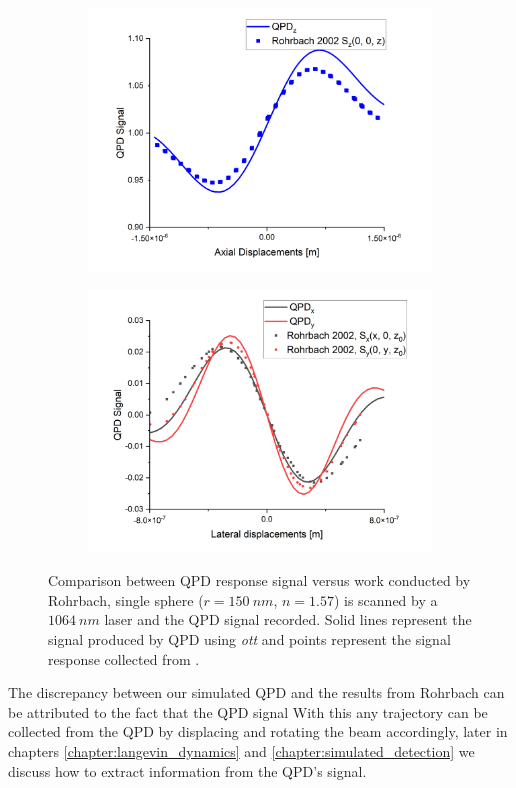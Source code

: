 \begin{figure}[h!]
	\begin{subfigure}{0.475 \linewidth}
		\subcaption{}
		\includegraphics[width=\linewidth]{QPD_axial_tests.png}
	\end{subfigure}
	\begin{subfigure}{0.475 \linewidth}
		\subcaption{}
		\includegraphics[width=\linewidth]{QPD_lat_tests.png}
	\end{subfigure}
	\caption{Comparison between QPD response signal versus work conducted by 
		Rohrbach, single sphere ($r = 150\ nm$, $n=1.57$) is scanned by a $1064\ nm$ laser and the QPD signal recorded. Solid lines represent the signal 
		produced by QPD using \textit{ott} and points represent the signal 
		response collected from \cite{Rohrbach2002}.}
	\label{fig:Rohrbach}
\end{figure}

The discrepancy between our simulated QPD and the results from 
Rohrbach can be attributed to the fact that the QPD signal  With this any trajectory can be collected from the QPD by displacing and 
rotating the beam accordingly, later in chapters \ref{chapter:langevin_dynamics} 
and \ref{chapter:simulated_detection} we discuss how to extract information 
from the QPD's signal.
